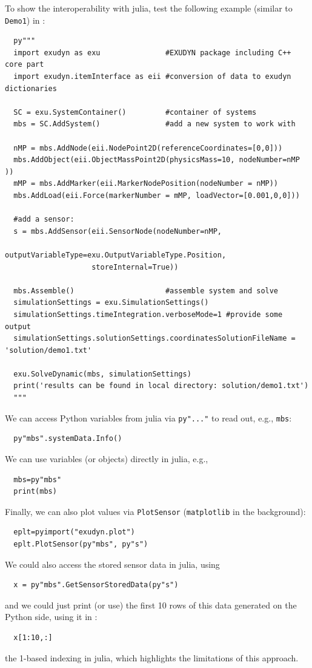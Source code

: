 To show the interoperability with julia, test the following example (similar to \texttt{Demo1}) in :
\begin{lstlisting}
  py"""
  import exudyn as exu               #EXUDYN package including C++ core part
  import exudyn.itemInterface as eii #conversion of data to exudyn dictionaries

  SC = exu.SystemContainer()         #container of systems
  mbs = SC.AddSystem()               #add a new system to work with

  nMP = mbs.AddNode(eii.NodePoint2D(referenceCoordinates=[0,0]))
  mbs.AddObject(eii.ObjectMassPoint2D(physicsMass=10, nodeNumber=nMP ))
  mMP = mbs.AddMarker(eii.MarkerNodePosition(nodeNumber = nMP))
  mbs.AddLoad(eii.Force(markerNumber = mMP, loadVector=[0.001,0,0]))

  #add a sensor:
  s = mbs.AddSensor(eii.SensorNode(nodeNumber=nMP,
                    outputVariableType=exu.OutputVariableType.Position,
                    storeInternal=True))

  mbs.Assemble()                     #assemble system and solve
  simulationSettings = exu.SimulationSettings()
  simulationSettings.timeIntegration.verboseMode=1 #provide some output
  simulationSettings.solutionSettings.coordinatesSolutionFileName = 'solution/demo1.txt'

  exu.SolveDynamic(mbs, simulationSettings)
  print('results can be found in local directory: solution/demo1.txt')
  """
\end{lstlisting}
We can access Python variables from julia via \texttt{py"..."} to read out, e.g., \texttt{mbs}:
  \begin{lstlisting}
  py"mbs".systemData.Info()
\end{lstlisting}
%
We can use variables (or objects) directly in julia, e.g., 
\begin{lstlisting}
  mbs=py"mbs"
  print(mbs)
\end{lstlisting}
%
Finally, we can also plot values via \texttt{PlotSensor} (\texttt{matplotlib} in the background):
\begin{lstlisting}
  eplt=pyimport("exudyn.plot")
  eplt.PlotSensor(py"mbs", py"s")
\end{lstlisting}
We could also access the stored sensor data in julia, using
\begin{lstlisting}
  x = py"mbs".GetSensorStoredData(py"s")
\end{lstlisting}
and we could just print (or use) the first 10 rows of this data generated on the Python side, using it in :
\begin{lstlisting}
  x[1:10,:]
\end{lstlisting}
 the 1-based indexing in julia, which highlights the limitations of this approach.

